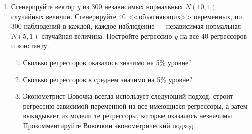 \documentclass[pdftex,12pt,a4paper]{article}
\newcommand{\solution}[1]{ {\tiny #1} }
\begin{document}
\begin{enumerate}
\item Сгенерируйте вектор $y$ из 300 независимых нормальных $N(10,1)$ случайных величин. Сгенерируйте 40 <<объясняющих>> переменных, по 300 наблюдений в каждой, каждое наблюдение --- независимая нормальная $N(5,1)$ случайная величина. Постройте регрессию $y$ на все 40 регрессоров и константу. 
\begin{enumerate}
\item Сколько регрессоров оказалось значимо на 5\% уровне?
\item Сколько регрессоров в среднем значимо на 5\% уровне?
\item Эконометрист Вовочка всегда использует следующий подход: строит регрессию зависимой переменной на все имеющиеся регрессоры, а затем выкидывает из модели те регрессоры, которые оказались незначимы. Прокомментируйте Вовочкин эконометрический подход.
\end{enumerate}
\solution{}




\end{enumerate}
\end{document}
